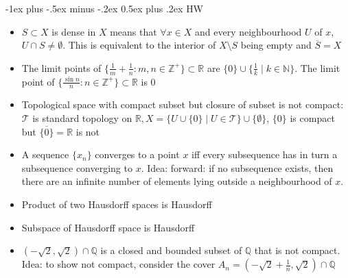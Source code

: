 \documentclass[frenchspacing,9pt,landscape,a4paper]{article}
\makeatletter
\renewcommand{\section}{\@startsection{section}{1}{0mm}%
                                {-1ex plus -.5ex minus -.2ex}%
                                {0.5ex plus .2ex}%
                                {\normalfont\large\bfseries}}
\newcommand{\BR}{\mathbb R}
\newcommand{\BQ}{\mathbb Q}
\newcommand{\BZ}{\mathbb Z}
\newcommand{\BN}{\mathbb N}
\theoremstyle{remark}
\makeatother
\begin{document}
\begin{multicols}{4}
\section{HW}
\begin{itemize}
    \item $S\subset X$ is dense in  $X$ means that  $\forall x\in X$ and every neighbourhood
        $U$ of  $x$,  $U\cap S\neq\emptyset$. This is equivalent to the interior of $X\setminus S$ being
        empty and $\overline{S}=X$
    \item The limit points of $\{\frac{1}{m}+\frac{1}{n}:m,n\in\BZ^+\}\subset\BR$ are
        $\{0\}\cup\{\frac{1}{k}\mid k\in\BN\}$. The limit point of $\{\frac{\sin
        n}{n}:n\in\BZ^+\}\subset\BR$ is $0$
    \item Topological space with compact subset but closure of subset is not compact:
        $\mathcal{T}$ is standard topology on  $\BR, $$X=\{U\cup\{0\}\mid
        U\in\mathcal{T}\}\cup\{\emptyset\}$, $\{0\}$ is compact but $\overline{\{0\}}=\BR$ is not
    \item A sequence $\{x_n\}$ converges to a point  $x$ iff every subsequence has in turn a subsequence
        converging to  $x$. Idea: forward: if no subsequence exists, then there are an infinite number of
        elements lying outside a neighbourhood of  $x$.
    \item Product of two Hausdorff spaces is Hausdorff
    \item Subspace of Hausdorff space is Hausdorff
    \item $(-\sqrt{2},\sqrt{2})\cap\BQ$ is a closed and bounded subset of  $\BQ$ that is not compact. Idea:
        to show not compact, consider the cover $A_n=(-\sqrt{2}+\frac{1}{n},\sqrt{2})\cap\BQ$
\end{itemize}

\end{multicols}
\end{document}
